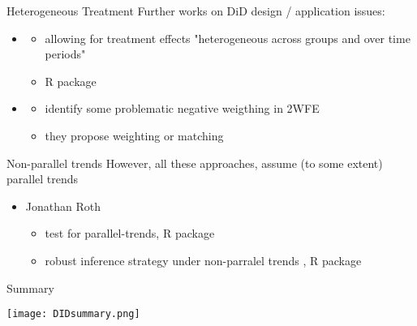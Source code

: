 \documentclass[aspectratio=169]{beamer}
\begin{document}
		\begin{frame}{Heterogeneous Treatment}
			Further works on DiD design / application issues:
			\\ \vspace*{.25cm}
			\begin{itemize}
				\item \cite{DeChaisemartin2018}
				\begin{itemize}
					\item allowing for treatment effects "heterogeneous across groups and over time periods"
					\item R package \href{https://cran.r-project.org/web/packages/DIDmultiplegt/index.html}{\underline{}}
				\end{itemize}
				\item \cite{Imai2020}
				\begin{itemize}
					\item identify some problematic negative weigthing in 2WFE
					\item they propose weighting or matching \href{https://imai.fas.harvard.edu/research/twoway.html}{\underline{}}
				\end{itemize}
			\end{itemize}
		\end{frame}

		\begin{frame}{Non-parallel trends}
			However, all these approaches, assume (to some extent) parallel trends
			\\ \vspace*{.25cm}
			\begin{itemize}
				\item Jonathan Roth \citeyear{Roth2021}
					\begin{itemize}
						\item test for parallel-trends, R package \href{https://github.com/jonathandroth/pretrends}{\underline{}}
						\item robust inference strategy under non-parralel trends \cite{Rambachan2020}, R package \href{https://github.com/asheshrambachan/HonestDiD}{\underline{}}
					\end{itemize}
			\end{itemize}
		\end{frame}

		\begin{frame}{Summary}
			\begin{center}
				\texttt{[image: DIDsummary.png]}
			\end{center}
		\end{frame}
\end{document}

